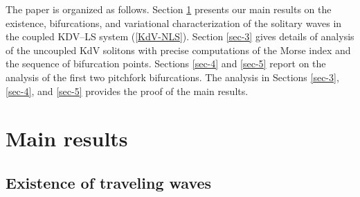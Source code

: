 \documentclass[12pt,reqno]{amsart}
\numberwithin{equation}{section}
\begin{document}
The paper is organized as follows. Section \ref{sec-2} presents our 
main results on the existence, bifurcations, and variational characterization 
of the solitary waves in the coupled KDV--LS system (\ref{KdV-NLS}). Section \ref{sec-3} gives details of analysis of the 
uncoupled KdV solitons with precise computations of the Morse index 
and the sequence of bifurcation points. Sections \ref{sec-4} and \ref{sec-5} report on the analysis of the first two pitchfork bifurcations. The analysis in Sections \ref{sec-3}, \ref{sec-4}, and \ref{sec-5} provides the proof of the main results.


\section{Main results}
\label{sec-2}

\subsection{Existence of traveling waves}
\end{document}
